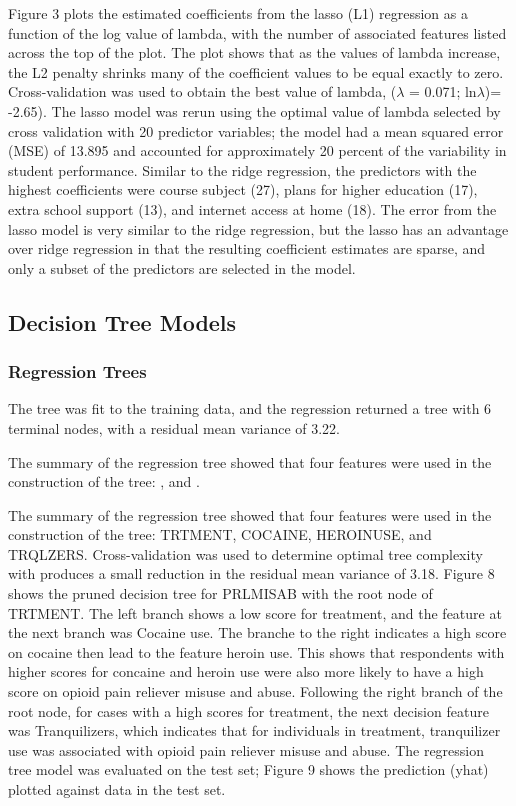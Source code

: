\documentclass[sigconf]{acmart}
\begin{document}
Figure 3 plots the estimated coefficients from the lasso (L1) regression as 
a function of the log value of lambda, with the number of associated features 
listed across the top of the plot. The plot shows that as the values of lambda 
increase, the L2 penalty shrinks many of the coefficient values to be equal 
exactly to zero. Cross-validation was used to obtain the best value of lambda, 
($\lambda$ = 0.071; ln$\lambda$)= -2.65). The lasso model was rerun using
the optimal value of lambda selected by cross validation with 20 predictor 
variables; the model had a mean squared error (MSE) of 13.895 and accounted 
for approximately 20 percent of the variability in student performance. 
Similar to the ridge regression, the predictors with the highest coefficients 
were course subject (27), plans for higher education (17), extra school support 
(13), and internet access at home (18). The error from the lasso model is very 
similar to the ridge regression, but the lasso has an advantage over ridge 
regression in that the resulting coefficient estimates are sparse, and only 
a subset of the predictors are selected in the model. 


\subsection{Decision Tree Models}

\subsubsection{Regression Trees}

The tree was fit to the training data, and the regression returned a tree with 
6 terminal nodes, with a residual mean variance of 3.22. 

The summary of the regression tree showed that four features were used in the 
construction of the tree: , and . 

The summary of the 
regression tree showed that four features were used in the construction of 
the tree: TRTMENT, COCAINE, HEROINUSE, and TRQLZERS. Cross-validation 
was used to determine optimal tree complexity with produces a small reduction
in the residual mean variance of 3.18. Figure 8 shows the pruned decision tree 
for PRLMISAB with the root node of TRTMENT. The left branch shows a low 
score for treatment, and the feature at the next branch was Cocaine use. 
The branche to the right indicates a high score on cocaine then lead to 
the feature heroin use. This shows that respondents with higher scores for 
concaine and heroin use were also more likely to have a high score on 
opioid pain reliever misuse and abuse. Following the right branch of the 
root node, for cases with a high scores for treatment, the next decision 
feature was Tranquilizers, which indicates that for individuals in treatment, 
tranquilizer use was associated with opioid pain reliever misuse and abuse. 
The regression tree model was evaluated on the test set; Figure 9 shows 
the prediction (yhat) plotted against data in the test set.
\end{document}
